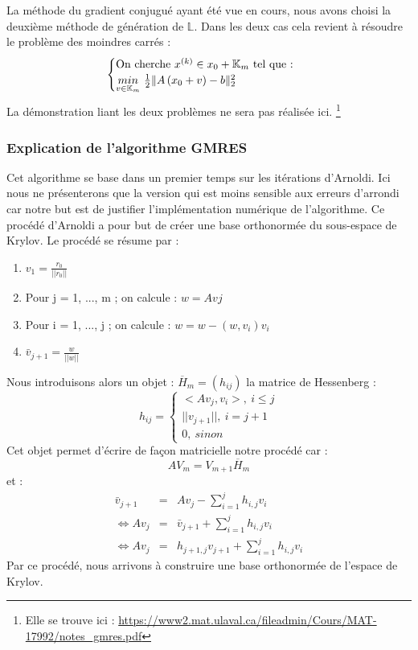 La méthode du gradient conjugué ayant été vue en cours, nous avons choisi la deuxième méthode de génération de $\mathbb{L}$. Dans les deux cas cela revient à résoudre le problème des moindres carrés : 
\begin{equation}
\begin{cases}
\text{On cherche $x^{(k)} \in x_0 + \mathbb{K}_m$ tel que : }\\
\underset{v \in \mathbb{K}_m}{min} \ \frac{1}{2}\|A \left(x_0 + v\right) - b\|^2_2
\end{cases}
\label{moindrecarre}
\end{equation}
La démonstration liant les deux problèmes ne sera pas réalisée ici. \footnote{Elle se trouve ici : \url{https://www2.mat.ulaval.ca/fileadmin/Cours/MAT-17992/notes_gmres.pdf}}
\subsubsection{Explication de l'algorithme GMRES}
Cet algorithme se base dans un premier temps sur les itérations d'Arnoldi. Ici nous ne présenterons que la version qui est moins sensible aux erreurs d'arrondi car notre but est de justifier l'implémentation numérique de l'algorithme. Ce procédé d'Arnoldi a pour but de créer une base orthonormée du sous-espace de Krylov. Le procédé se résume par : 
\begin{enumerate}
	\item $v_1 = \frac{r_0}{||r_0||}$
	\item Pour j = 1, ..., m ; on calcule : $w = Avj$
	\item Pour i = 1, ..., j ; on calcule : $w = w - (w, v_i) v_i$
	\item $\bar{v}_{j+1} = \frac{w}{||w||}$
\end{enumerate}

Nous introduisons alors un objet : $\overline{H}_m = (h_{ij})$ la matrice de Hessenberg : 
\begin{equation}
h_{ij} = \begin{cases}
<Av_j, v_i>, \ i\leq j \\
||v_{j+1}||, \ i = j + 1 \\
0, \ sinon
\end{cases}
\end{equation}
Cet objet permet d'écrire de façon matricielle notre procédé car  : 
\begin{equation}
AV_m = V_{m+1}\overline{H}_m
\end{equation}
et : 
\begin{eqnarray}
\bar{v}_{j+1} &=& Av_j - \sum_{i=1}^{j} h_{i,j} v_i\\
\Leftrightarrow Av_j &=& \bar{v}_{j+1} + \sum_{i=1}^{j} h_{i,j} v_i \\
\Leftrightarrow Av_j &=& h_{j+1, j}v_{j+1} + \sum_{i=1}^{j} h_{i,j} v_i
\end{eqnarray}
Par ce  procédé, nous arrivons à construire une base orthonormée de l'espace de Krylov.\\


